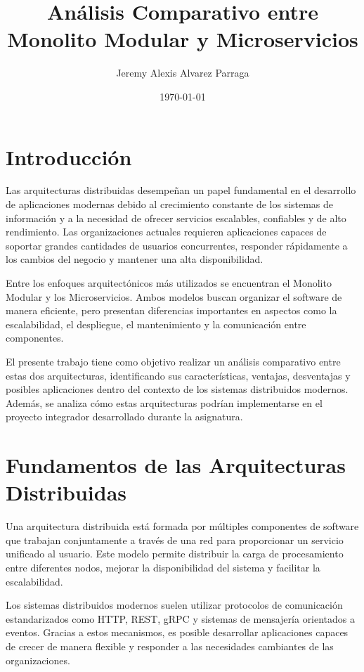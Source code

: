 \documentclass[12pt,a4paper]{article}
\title{Análisis Comparativo entre Monolito Modular y Microservicios}
\author{Jeremy Alexis Alvarez Parraga}
\date{\today}
\begin{document}
\maketitle
\section{Introducción}

Las arquitecturas distribuidas desempeñan un papel fundamental en el desarrollo de aplicaciones modernas debido al crecimiento constante de los sistemas de información y a la necesidad de ofrecer servicios escalables, confiables y de alto rendimiento. Las organizaciones actuales requieren aplicaciones capaces de soportar grandes cantidades de usuarios concurrentes, responder rápidamente a los cambios del negocio y mantener una alta disponibilidad.

Entre los enfoques arquitectónicos más utilizados se encuentran el Monolito Modular y los Microservicios. Ambos modelos buscan organizar el software de manera eficiente, pero presentan diferencias importantes en aspectos como la escalabilidad, el despliegue, el mantenimiento y la comunicación entre componentes.

El presente trabajo tiene como objetivo realizar un análisis comparativo entre estas dos arquitecturas, identificando sus características, ventajas, desventajas y posibles aplicaciones dentro del contexto de los sistemas distribuidos modernos. Además, se analiza cómo estas arquitecturas podrían implementarse en el proyecto integrador desarrollado durante la asignatura.

\section{Fundamentos de las Arquitecturas Distribuidas}

Una arquitectura distribuida está formada por múltiples componentes de software que trabajan conjuntamente a través de una red para proporcionar un servicio unificado al usuario. Este modelo permite distribuir la carga de procesamiento entre diferentes nodos, mejorar la disponibilidad del sistema y facilitar la escalabilidad.

Los sistemas distribuidos modernos suelen utilizar protocolos de comunicación estandarizados como HTTP, REST, gRPC y sistemas de mensajería orientados a eventos. Gracias a estos mecanismos, es posible desarrollar aplicaciones capaces de crecer de manera flexible y responder a las necesidades cambiantes de las organizaciones.
\end{document}
